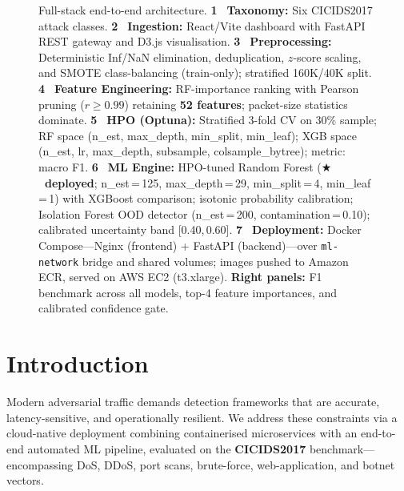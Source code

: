 \documentclass[9pt,conference]{IEEEtran}
\begin{document}
\begin{figure}[!b]
{\begin{tikzpicture}
\end{tikzpicture}
}
\caption{Full-stack end-to-end architecture.
  \textbf{\textcircled{\tiny 1}~Taxonomy:} Six CICIDS2017 attack classes.
  \textbf{\textcircled{\tiny 2}~Ingestion:} React/Vite dashboard with FastAPI REST gateway and D3.js visualisation.
  \textbf{\textcircled{\tiny 3}~Preprocessing:} Deterministic Inf/NaN elimination, deduplication, $z$-score scaling,
  and SMOTE class-balancing (train-only); stratified 160K/40K split.
  \textbf{\textcircled{\tiny 4}~Feature Engineering:} RF-importance ranking with Pearson pruning ($r\!\ge\!0.99$)
  retaining \textbf{52 features}; packet-size statistics dominate.
  \textbf{\textcircled{\tiny 5}~HPO (Optuna):} Stratified 3-fold CV on 30\% sample; RF space (n\_est, max\_depth,
  min\_split, min\_leaf); XGB space (n\_est, lr, max\_depth, subsample, colsample\_bytree); metric: macro F1.
  \textbf{\textcircled{\tiny 6}~ML Engine:} HPO-tuned Random Forest (\textbf{$\bigstar$~deployed}; n\_est\,=\,125,
  max\_depth\,=\,29, min\_split\,=\,4, min\_leaf\,=\,1) with XGBoost comparison; isotonic
  probability calibration; Isolation Forest OOD detector (n\_est\,=\,200, contamination\,=\,0.10);
  calibrated uncertainty band [0.40,\,0.60].
  \textbf{\textcircled{\tiny 7}~Deployment:} Docker Compose---Nginx (frontend) + FastAPI (backend)---over
  \texttt{ml-network} bridge and shared volumes; images pushed to Amazon ECR, served on
  AWS EC2 (t3.xlarge).
  \textbf{Right panels:} F1 benchmark across all models, top-4 feature importances,
  and calibrated confidence gate.}
\label{fig:architecture}
\end{figure}


\section{Introduction}
Modern adversarial traffic demands detection frameworks that are accurate, latency-sensitive, and operationally resilient. We address these constraints via a cloud-native deployment combining containerised microservices with an end-to-end automated ML pipeline, evaluated on the \textbf{CICIDS2017} benchmark---encompassing DoS, DDoS, port scans, brute-force, web-application, and botnet vectors.
\end{document}
